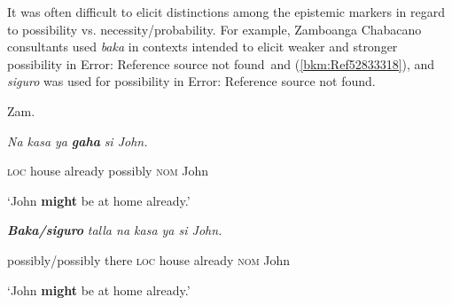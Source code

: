 \begin{styleStandard}
It was often difficult to elicit distinctions among the epistemic markers in regard to possibility vs. necessity/probability. For example, Zamboanga Chabacano consultants used \textit{baka} in contexts intended to elicit weaker and stronger possibility in Error: Reference source not found\ and (\ref{bkm:Ref52833318}), and \textit{siguro} was used for possibility in Error: Reference source not found.
\end{styleStandard}

\begin{listWWNumiileveli}
\item 
\begin{stylelsLanginfo}
Zam.
\end{stylelsLanginfo}

\begin{listWWNumiilevelii}
\item 
\begin{stylelsLanginfo}
\textit{Na kasa ya }\textbf{\textit{gaha}}\textit{ si John.}
\end{stylelsLanginfo}
\end{listWWNumiilevelii}
\end{listWWNumiileveli}
\begin{stylelsIMT}
\textsc{loc} house already possibly \textsc{nom }John
\end{stylelsIMT}

\begin{stylelsTranslation}
‘John \textbf{might} be at home already.’
\end{stylelsTranslation}

\begin{listWWNumiileveli}
\item 
\begin{listWWNumiilevelii}
\item 
\begin{stylelsLanginfo}
\textbf{\textit{Baka/siguro}}\textbf{ }\textit{talla na kasa ya si John.}
\end{stylelsLanginfo}
\end{listWWNumiilevelii}
\end{listWWNumiileveli}
\begin{stylelsIMT}
possibly/possibly there \textsc{loc} house already \textsc{nom }John
\end{stylelsIMT}

\begin{stylelsTranslation}
‘John \textbf{might} be at home already.’
\end{stylelsTranslation}

